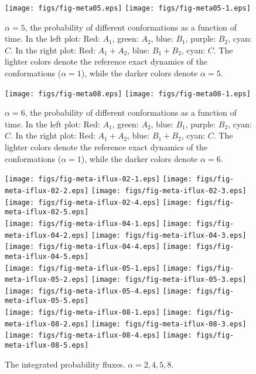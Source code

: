 \documentclass[aip,jcp,a4paper,reprint,onecolumn]{revtex4-1}
\begin{document}
\begin{figure}
  \centering
  \texttt{[image: figs/fig-meta05.eps]}
  \texttt{[image: figs/fig-meta05-1.eps]}
  \caption{$\alpha = 5$, the probability of different conformations as a function of time.
    In the left plot: Red: $A_1$, green: $A_2$, blue: $B_1$, purple: $B_2$, cyan: $C$.
    In the right plot: Red: $A_1+A_2$, blue: $B_1+B_2$, cyan: $C$.
    The lighter colors denote the reference exact dynamics of the conformations ($\alpha = 1$), while the darker colors denote $\alpha = 5$.}
  \label{fig:tmp2}
\end{figure}

\begin{figure}
  \centering
  \texttt{[image: figs/fig-meta08.eps]}
  \texttt{[image: figs/fig-meta08-1.eps]}
  \caption{$\alpha = 6$, the probability of different conformations as a function of time.
    In the left plot: Red: $A_1$, green: $A_2$, blue: $B_1$, purple: $B_2$, cyan: $C$.
    In the right plot: Red: $A_1+A_2$, blue: $B_1+B_2$, cyan: $C$.
    The lighter colors denote the reference exact dynamics of the conformations ($\alpha = 1$), while the darker colors denote $\alpha = 6$.}
  \label{fig:tmp3}
\end{figure}


\begin{figure}
  \centering
  \texttt{[image: figs/fig-meta-iflux-02-1.eps]}
  \texttt{[image: figs/fig-meta-iflux-02-2.eps]}
  \texttt{[image: figs/fig-meta-iflux-02-3.eps]}
  \texttt{[image: figs/fig-meta-iflux-02-4.eps]}
  \texttt{[image: figs/fig-meta-iflux-02-5.eps]}\\
  \texttt{[image: figs/fig-meta-iflux-04-1.eps]}
  \texttt{[image: figs/fig-meta-iflux-04-2.eps]}
  \texttt{[image: figs/fig-meta-iflux-04-3.eps]}
  \texttt{[image: figs/fig-meta-iflux-04-4.eps]}
  \texttt{[image: figs/fig-meta-iflux-04-5.eps]}\\
  \texttt{[image: figs/fig-meta-iflux-05-1.eps]}
  \texttt{[image: figs/fig-meta-iflux-05-2.eps]}
  \texttt{[image: figs/fig-meta-iflux-05-3.eps]}
  \texttt{[image: figs/fig-meta-iflux-05-4.eps]}
  \texttt{[image: figs/fig-meta-iflux-05-5.eps]}\\
  \texttt{[image: figs/fig-meta-iflux-08-1.eps]}
  \texttt{[image: figs/fig-meta-iflux-08-2.eps]}
  \texttt{[image: figs/fig-meta-iflux-08-3.eps]}
  \texttt{[image: figs/fig-meta-iflux-08-4.eps]}
  \texttt{[image: figs/fig-meta-iflux-08-5.eps]}\\
  \caption{The integrated probability fluxes. $\alpha = 2,4,5,8$.}
  \label{fig:tmp3}
\end{figure}
\end{document}
